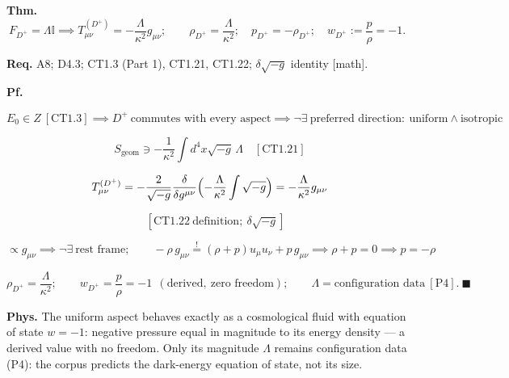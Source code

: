 \begin{theorem}\label{tag:CT1-25}
\textbf{Thm.} $\ F_{D^+}=\Lambda\mathbb I\implies T^{(D^+)}_{\mu\nu}=-\dfrac{\Lambda}{\kappa^2}g_{\mu\nu};\qquad\rho_{D^+}=\dfrac{\Lambda}{\kappa^2};\quad p_{D^+}=-\rho_{D^+};\quad w_{D^+}:=\dfrac{p}{\rho}=-1.$

\textbf{Req.} A8; D4.3; CT1.3 (Part 1), CT1.21, CT1.22; $\delta\sqrt{-g}$ identity [math].

\textbf{Pf.}

\[
E_0\in Z\ [\mathrm{CT1.3}]\implies D^+\ \text{commutes with every aspect}\implies\neg\exists\ \text{preferred direction}:\ \text{uniform}\wedge\text{isotropic}
\]

\[
S_{\mathrm{geom}}\ni-\frac{1}{\kappa^2}\int d^4x\sqrt{-g}\,\Lambda\quad[\mathrm{CT1.21}]
\]

\[
T^{(D^+)}_{\mu\nu}=-\frac{2}{\sqrt{-g}}\frac{\delta}{\delta g^{\mu\nu}}\Bigl(-\frac{\Lambda}{\kappa^2}\int\sqrt{-g}\Bigr)=-\frac{\Lambda}{\kappa^2}g_{\mu\nu}
\]

\[
\quad [\mathrm{CT1.22}\ \text{definition};\ \delta\sqrt{-g}]
\]

\[
\propto g_{\mu\nu}\implies\neg\exists\ \text{rest frame};\qquad
-\rho\,g_{\mu\nu}\overset!=(\rho+p)u_\mu u_\nu+p\,g_{\mu\nu}\implies\rho+p=0\implies p=-\rho
\]

\[
\rho_{D^+}=\frac{\Lambda}{\kappa^2};\qquad w_{D^+}=\frac{p}{\rho}=-1\ \ (\text{derived},\ \text{zero freedom});\qquad\Lambda=\text{configuration data}\ [\mathrm{P4}].\ \blacksquare
\]

\textbf{Phys.} The uniform aspect behaves exactly as a cosmological fluid with equation of state $w=-1$: negative pressure equal in magnitude to its energy density — a derived value with no freedom. Only its magnitude $\Lambda$ remains configuration data (P4): the corpus predicts the dark-energy equation of state, not its size.

\end{theorem}

